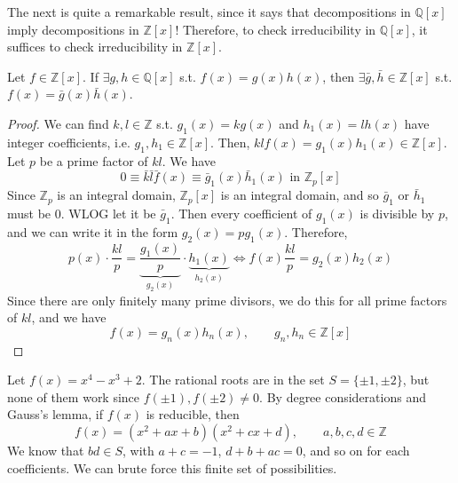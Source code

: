   The next is quite a remarkable result, since it says that decompositions in $\mathbb{Q}[x]$ imply decompositions in $\mathbb{Z}[x]$! Therefore, to check irreducibility in $\mathbb{Q}[x]$, it suffices to check irreducibility in $\mathbb{Z}[x]$. 

  \begin{lemma}
    Let $f \in \mathbb{Z}[x]$. If $\exists g, h \in \mathbb{Q}[x]$ s.t. $f(x) = g(x) h(x)$, then $\exists \bar{g}, \bar{h} \in \mathbb{Z}[x]$ s.t. $f(x) = \bar{g}(x) \bar{h}(x)$. 
  \end{lemma}
  \begin{proof}
    We can find $k, l \in \mathbb{Z}$ s.t. $g_1 (x) = k g(x)$ and $h_1 (x) = l h(x)$ have integer coefficients, i.e. $g_1, h_1 \in \mathbb{Z}[x]$. Then, $k l f(x) = g_1 (x) h_1 (x) \in \mathbb{Z}[x]$. Let $p$ be a prime factor of $kl$. We have 
    \begin{equation}
      0 \equiv \bar{k} \bar{l} \bar{f} (x) \equiv \bar{g}_1 (x) \bar{h}_1 (x) \text{ in } \mathbb{Z}_p [x]
    \end{equation}
    Since $\mathbb{Z}_p$ is an integral domain, $\mathbb{Z}_p [x]$ is an integral domain, and so $\bar{g}_1$ or $\bar{h}_1$ must be $0$. WLOG let it be $\bar{g}_1$. Then every coefficient of $g_1 (x)$ is divisible by $p$, and we can write it in the form $g_2(x) = p g_1 (x)$. Therefore, 
    \begin{equation}
      p(x) \cdot \frac{kl}{p} = \underbrace{\frac{g_1 (x)}{p}}_{g_2 (x)} \cdot \underbrace{h_1 (x)}_{h_2 (x)} \iff f(x) \frac{kl}{p} = g_2 (x) h_2 (x)
    \end{equation}
    Since there are only finitely many prime divisors, we do this for all prime factors of $kl$, and we have 
    \begin{equation}
      f(x) = g_n (x) h_n (x), \qquad g_n, h_n \in \mathbb{Z}[x]
    \end{equation}
  \end{proof}

  \begin{example}
    Let $f(x) = x^4 - x^3 + 2$. The rational roots are in the set $S = \{\pm 1, \pm2 \}$, but none of them work since $f(\pm1), f(\pm2) \neq 0$. By degree considerations and Gauss's lemma, if $f(x)$ is reducible, then 
    \begin{equation}
      f(x) = (x^2 + ax + b) (x^2 + cx + d), \qquad a, b, c, d \in \mathbb{Z}
    \end{equation}
    We know that $bd \in S$, with $a + c = -1$, $d + b + ac = 0$, and so on for each coefficients. We can brute force this finite set of possibilities. 
  \end{example}

